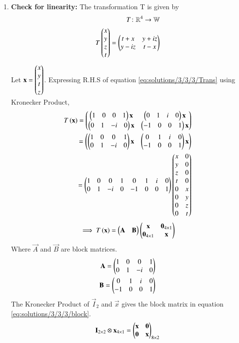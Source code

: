 \begin{enumerate}
\item \textbf{Check for linearity:}
The transformation T is given by
\begin{align}
T\colon\mathbb{R}^4\to\mathbb{W}\\
T\begin{pmatrix}x\\y\\z\\t\end{pmatrix}=\begin{pmatrix}t+x&y+iz\\y-iz&t-x\end{pmatrix} \label{eq:solutions/3/3/3/Trans}
\end{align}
Let $\mathbf{x}=\begin{pmatrix}x\\y\\t\\z\end{pmatrix}$. Expressing R.H.S of equation \eqref{eq:solutions/3/3/3/Trans} using Kronecker Product, 
\begin{align}
T\left(\mathbf{x}\right)=\begin{pmatrix}\begin{pmatrix}1&0&0&1\end{pmatrix}\mathbf{x}&\begin{pmatrix}0&1&i&0\end{pmatrix}\mathbf{x}\\\begin{pmatrix}0&1&-i&0\end{pmatrix}\mathbf{x}&\begin{pmatrix}-1&0&0&1\end{pmatrix}\mathbf{x}\end{pmatrix}\\
=\begin{pmatrix}\begin{pmatrix}1&0&0&1\\0&1&-i&0\end{pmatrix}\mathbf{x}&\begin{pmatrix}0&1&i&0\\-1&0&0&1\end{pmatrix}\mathbf{x}\end{pmatrix}\\
=\begin{pmatrix}1&0&0&1&0&1&i&0\\0&1&-i&0&-1&0&0&1\end{pmatrix}\begin{pmatrix}x&0\\y&0\\z&0\\t&0\\0&x\\0&y\\0&z\\0&t\end{pmatrix}
\end{align}
\begin{align}
\implies T\left(\mathbf{x}\right)=\begin{pmatrix}\mathbf{A}&\mathbf{B}\end{pmatrix}\begin{pmatrix}\mathbf{x}&\mathbf{0}_{4\times1}\\\mathbf{0}_{4\times1}&\mathbf{x}\end{pmatrix}\label{eq:solutions/3/3/3/block}
\end{align}
Where $\vec{A}$ and $\vec{B}$ are block matrices.
\begin{align}
\mathbf{A}=\begin{pmatrix}1&0&0&1\\0&1&-i&0\end{pmatrix}\\
\mathbf{B}=\begin{pmatrix}0&1&i&0\\-1&0&0&1\end{pmatrix}
\end{align}
The Kronecker Product of $\vec{I}_2$ and $\vec{x}$ gives the block matrix in equation \eqref{eq:solutions/3/3/3/block}.
\begin{align}
\vec{I}_{2\times2}\otimes\vec{x}_{4\times1}=\myvec{\vec{x}&\vec{0}\\\vec{0}&\vec{x}}_{8\times2}

\end{align}
\end{enumerate}
